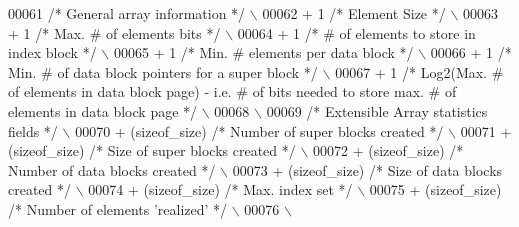\begin{DoxyCode}
00061 \textcolor{preprocessor}{    }\textcolor{comment}{/* General array information */}\textcolor{preprocessor}{                                           \(\backslash\)}
00062 \textcolor{preprocessor}{    + 1 }\textcolor{comment}{/* Element Size */}\textcolor{preprocessor}{                                                    \(\backslash\)}
00063 \textcolor{preprocessor}{    + 1 }\textcolor{comment}{/* Max. # of elements bits */}\textcolor{preprocessor}{                                         \(\backslash\)}
00064 \textcolor{preprocessor}{    + 1 }\textcolor{comment}{/* # of elements to store in index block */}\textcolor{preprocessor}{                           \(\backslash\)}
00065 \textcolor{preprocessor}{    + 1 }\textcolor{comment}{/* Min. # elements per data block */}\textcolor{preprocessor}{                                  \(\backslash\)}
00066 \textcolor{preprocessor}{    + 1 }\textcolor{comment}{/* Min. # of data block pointers for a super block */}\textcolor{preprocessor}{                 \(\backslash\)}
00067 \textcolor{preprocessor}{    + 1 }\textcolor{comment}{/* Log2(Max. # of elements in data block page) - i.e. # of bits needed to store max. # of elements
       in data block page */}\textcolor{preprocessor}{ \(\backslash\)}
00068 \textcolor{preprocessor}{                                                                              \(\backslash\)}
00069 \textcolor{preprocessor}{    }\textcolor{comment}{/* Extensible Array statistics fields */}\textcolor{preprocessor}{                                  \(\backslash\)}
00070 \textcolor{preprocessor}{    + (sizeof\_size) }\textcolor{comment}{/* Number of super blocks created */}\textcolor{preprocessor}{              \(\backslash\)}
00071 \textcolor{preprocessor}{    + (sizeof\_size) }\textcolor{comment}{/* Size of super blocks created */}\textcolor{preprocessor}{                    \(\backslash\)}
00072 \textcolor{preprocessor}{    + (sizeof\_size) }\textcolor{comment}{/* Number of data blocks created */}\textcolor{preprocessor}{                   \(\backslash\)}
00073 \textcolor{preprocessor}{    + (sizeof\_size) }\textcolor{comment}{/* Size of data blocks created */}\textcolor{preprocessor}{                 \(\backslash\)}
00074 \textcolor{preprocessor}{    + (sizeof\_size) }\textcolor{comment}{/* Max. index set */}\textcolor{preprocessor}{                          \(\backslash\)}
00075 \textcolor{preprocessor}{    + (sizeof\_size) }\textcolor{comment}{/* Number of elements 'realized' */}\textcolor{preprocessor}{                   \(\backslash\)}
00076 \textcolor{preprocessor}{                                                                              \(\backslash\)}

\end{DoxyCode}

